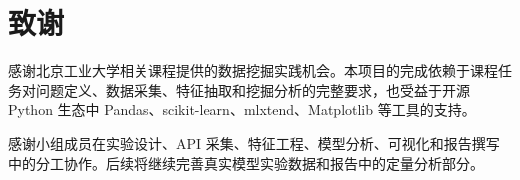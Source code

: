 
\chapter{致\quad 谢}


感谢北京工业大学相关课程提供的数据挖掘实践机会。本项目的完成依赖于课程任务对问题定义、数据采集、特征抽取和挖掘分析的完整要求，也受益于开源 Python 生态中 Pandas、scikit-learn、mlxtend、Matplotlib 等工具的支持。

感谢小组成员在实验设计、API 采集、特征工程、模型分析、可视化和报告撰写中的分工协作。后续将继续完善真实模型实验数据和报告中的定量分析部分。
